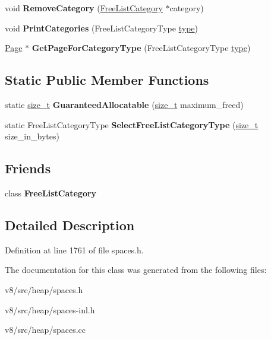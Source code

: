 \begin{DoxyCompactItemize}
void {\bfseries Remove\+Category} (\mbox{\hyperlink{classv8_1_1internal_1_1FreeListCategory}{Free\+List\+Category}} $\ast$category)
\item 
\mbox{\label{classv8_1_1internal_1_1FreeList_af3cbe43b30d422110caba0e7f86bf673}} 
void {\bfseries Print\+Categories} (Free\+List\+Category\+Type \mbox{\hyperlink{classstd_1_1conditional_1_1type}{type}})
\item 
\mbox{\label{classv8_1_1internal_1_1FreeList_ab93c1f4ef5eff83050c9ceba3b16b548}} 
\mbox{\hyperlink{classv8_1_1internal_1_1Page}{Page}} $\ast$ {\bfseries Get\+Page\+For\+Category\+Type} (Free\+List\+Category\+Type \mbox{\hyperlink{classstd_1_1conditional_1_1type}{type}})
\end{DoxyCompactItemize}
\subsection*{Static Public Member Functions}
\begin{DoxyCompactItemize}
\item 
\mbox{\label{classv8_1_1internal_1_1FreeList_a301749b00fbfdbbb2c4746e301f8bfe9}} 
static \mbox{\hyperlink{classsize__t}{size\+\_\+t}} {\bfseries Guaranteed\+Allocatable} (\mbox{\hyperlink{classsize__t}{size\+\_\+t}} maximum\+\_\+freed)
\item 
\mbox{\label{classv8_1_1internal_1_1FreeList_a12a26263cf9a2e2139a0f3fc76a5f246}} 
static Free\+List\+Category\+Type {\bfseries Select\+Free\+List\+Category\+Type} (\mbox{\hyperlink{classsize__t}{size\+\_\+t}} size\+\_\+in\+\_\+bytes)
\end{DoxyCompactItemize}
\subsection*{Friends}
\begin{DoxyCompactItemize}
\item 
\mbox{\label{classv8_1_1internal_1_1FreeList_ac7b8d83f9833f7883a102608d8720210}} 
class {\bfseries Free\+List\+Category}
\end{DoxyCompactItemize}


\subsection{Detailed Description}


Definition at line 1761 of file spaces.\+h.



The documentation for this class was generated from the following files\+:\begin{DoxyCompactItemize}
\item 
v8/src/heap/spaces.\+h\item 
v8/src/heap/spaces-\/inl.\+h\item 
v8/src/heap/spaces.\+cc\end{DoxyCompactItemize}
